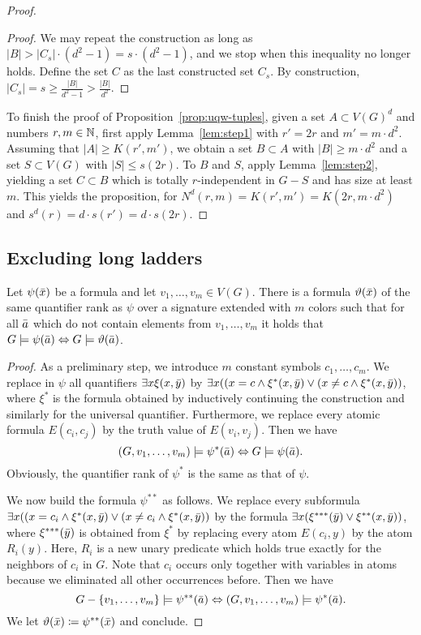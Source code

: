 \begin{proof}
\begin{proof}
We may repeat the construction as long as $|B|>|C_s|\cdot (d^2-1)=s\cdot (d^2-1)$, and we stop when this inequality no longer holds. Define the set $C$ as the last constructed set $C_s$.
By construction, $|C_s|=s\ge 
\frac{|B|}{d^2-1}>\frac{|B|}{d^2}$.	
\end{proof}

To finish the proof of Proposition~\ref{prop:uqw-tuples},
given a set $A\subset V(G)^d$ and numbers $r,m\in\mathbb{N}$,
first apply Lemma~\ref{lem:step1} 
  with $r'=2r$ and
 $m'= m\cdot d^2$.
 Assuming that $|A|\ge K(r',m')$, 
we obtain a set $B\subset A$ with $|B|\ge m\cdot d^2$ and a set $S\subset V(G)$ with $|S|\le s(2r)$.
To $B$ and $S$, apply Lemma~\ref{lem:step2}, yielding a set $C\subset B$ which is totally $r$-independent in $G-S$ and has size at least $m$. This yields the proposition, for $N^d(r,m)=K(r',m')=K(2r,m\cdot d^2)$ and $s^d(r)=d\cdot s(r')=d\cdot s(2r)$.
\end{proof}


\subsection{Excluding long ladders}

\begin{lemma}
Let $\psi(\bar{x})$ be a formula and let $v_1,\ldots, v_m\in V(G)$. 
There is a formula $\vartheta(\bar{x})$ 
of the same quantifier rank as $\psi$ over a signature extended 
with $m$ colors such that for all $\bar{a}$ which do not
contain elements from $v_1,\ldots, v_m$ it holds that
$G\models\psi(\bar{a})\Leftrightarrow G\models\vartheta(\bar{a})$. 
\end{lemma}
\begin{proof}
As a preliminary step, we introduce $m$ constant symbols 
$c_1,\ldots, c_m$. We replace in $\psi$ all quantifiers 
$\exists x\xi(x,\bar{y})$ by $\exists x((x=c \wedge \xi^*(x,\bar{y})
\vee (x\neq c\wedge \xi^*(x,\bar{y}))$, 
where $\xi^*$ is the formula obtained by inductively continuing the
construction and similarly for the universal quantifier. Furthermore, 
we replace every atomic formula $E(c_i,c_j)$ by the truth value of
$E(v_i,v_j)$. Then we have
\[(G,v_1,\ldots, v_m)\models\psi^*(\bar{a})\Leftrightarrow G\models\psi(\bar{a}).\]
Obviously, the quantifier rank of $\psi^*$ is the same as that of $\psi$. 

We now build the formula $\psi^{**}$ as follows. We replace
every subformula $\exists x((x=c_i \wedge \xi^*(x,\bar{y}) \vee 
(x\neq c_i \wedge \xi^*(x,\bar{y}))$ by the formula
$\exists x(\xi^{***}(\bar{y}) \vee \xi^{**}(x,\bar{y}))$, 
where $\xi^{***}(\bar{y})$ is obtained from $\xi^{*}$ by
replacing every atom $E(c_i,y)$ by the atom $R_i(y)$. Here, 
$R_i$ is a new unary predicate which holds true exactly for 
the neighbors of $c_i$ in $G$. Note that $c_i$ occurs only together
with variables in atoms because we eliminated all other occurrences
before. Then we have 
\[G-\{v_1,\ldots, v_m\}\models \psi^{**}(\bar{a})
\Leftrightarrow (G,v_1,\ldots, v_m)\models\psi^*(\bar{a}).\]
We let $\vartheta(\bar{x})\coloneqq \psi^{**}(\bar{x})$ and conclude. 
\end{proof}

